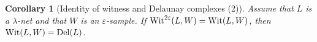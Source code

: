 \documentclass[11pt,a4paper]{article}
\newtheorem{definition}{Definition}
\newtheorem{corol}{Corollary}
\newenvironment{proof}
        {\noindent \textbf{Proof} \hspace{0.3mm}}
        {\hspace{0.3mm}$\square$  \smallskip}
\newcommand{\e}{\varepsilon}
\newcommand{\del}{{\rm Del}}
\newcommand{\wit}{{\rm Wit}}
\newcommand{\twit}{{\rm Kwit}}
\begin{document}
\begin{corol}[Identity of witness and Delaunay complexes (2)]
\label{lemma-wit=del2}
Assume that $L$ is a $\lambda$-net and
that $W$ is an $\e$-sample. If $\wit^{2\e}(L,W)=\wit(L,W)$, then  $\wit (L,W)= \del(L)$.
\end{corol}













\end{document}
